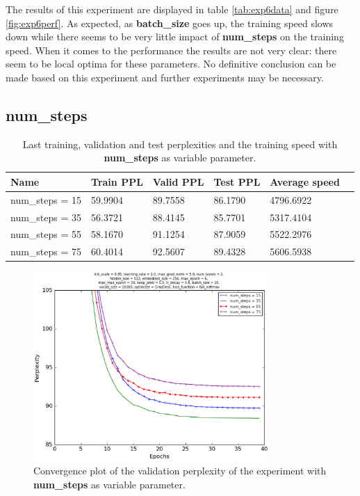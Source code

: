 \documentclass[10pt,a4paper,titlepage]{article}
\begin{document}
The results of this experiment are displayed in table \ref{tab:exp6data} and figure \ref{fig:exp6perf}. As expected,  as \textbf{batch\_size} goes up, the training speed slows down while there seems to be very little impact of \textbf{num\_steps} on the training speed. When it comes to the performance the results are not very clear: there seem to be local optima for these parameters. No definitive conclusion can be made based on this experiment and further experiments may be necessary.

\newpage

\subsection{num\_steps}

\begin{table}[H]
\centering
\caption{Last training, validation and test perplexities and the training speed with \textbf{num\_steps} as variable parameter.}
\label{tab:exp7data}
\begin{tabular}{|l|l|l|l|l|l|}
\hline
{\small Name} & {\small Train PPL} & {\small Valid PPL} & {\small Test PPL} & {\small Average speed}\\ \hline
{\small num\_steps = 15}                                & 59.9904    & 89.7558    & 86.1790    & 4796.6922  \\ \hline
{\small num\_steps = 35}                                & 56.3721    & 88.4145    & 85.7701    & 5317.4104  \\ \hline
{\small num\_steps = 55}                                & 58.1670    & 91.1254    & 87.9059    & 5522.2976  \\ \hline
{\small num\_steps = 75}                                & 60.4014    & 92.5607    & 89.4328    & 5606.5938  \\ \hline
\end{tabular}
\end{table}

\begin{figure}[H]
	\begin{center}
		\includegraphics[width=0.80\textwidth]{Figures/numstepsperf.eps}
		\caption{Convergence plot of the validation perplexity of the experiment with \textbf{num\_steps} as variable parameter. }
		\label{fig:exp7perf}
	\end{center}	
\end{figure}
\end{document}
